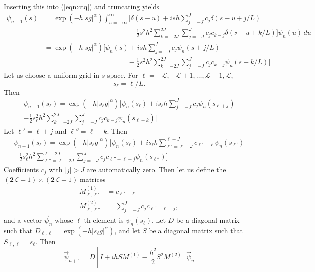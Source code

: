 \documentclass[11pt,letterpaper]{article}
\begin{document}
Inserting this into (\ref{eqn:ctq}) and truncating yields
\begin{align*}
 \psi_{n+1}(s) &=  \exp{\left(  -h |s g|^{\alpha} \right)} \int_{u=-\infty}^{\infty} \biggl[ \delta(s-u) + i s h \sum_{j=-J}^J c_j \delta(s - u + j/L) \\ 
 & \qquad \qquad \qquad \qquad \qquad \qquad - \frac{1}{2} s^2 h^2 \sum_{k=-2J}^{2J} \sum_{j=-J}^J c_j c_{k-j}  \delta(s - u + k/L) \biggr]
 \psi_{n}(u) \, du \\
 &= \exp{\left(  -h |s g|^{\alpha} \right)} \biggl[ \psi_n(s) + i s h \sum_{j=-J}^J c_j \psi_n(s+j/L) \\
 & \qquad \qquad \qquad \qquad \qquad \qquad- \frac{1}{2} s^2 h^2 \sum_{k=-2J}^{2J} \sum_{j=-J}^J c_j c_{k-j} \psi_n(s+k/L) \biggr]
\end{align*}
Let us choose a uniform grid in $s$ space.  For $\ell = -\mathcal{L}, -\mathcal{L}+1, \ldots, \mathcal{L}-1, \mathcal{L}$,
\[
s_{\ell} = \ell / L.
\]
Then
\begin{multline*}
\psi_{n+1}(s_{\ell}) = \exp{\left(  -h |s_{\ell} g|^{\alpha} \right)} \biggl[ \psi_n(s_{\ell}) + i s_{\ell} h \sum_{j=-J}^J c_j \psi_n( s_{\ell+j} ) \\
- \frac{1}{2} s_{\ell}^2 h^2 \sum_{k=-2J}^{2J} \sum_{j=-J}^J c_j c_{k-j} \psi_n( s_{\ell+k} ) \biggr]
\end{multline*}
Let $\ell' = \ell + j$ and $\ell'' = \ell + k$.  Then
\begin{multline*}
	\psi_{n+1}(s_{\ell}) = \exp{\left(  -h |s_{\ell} g|^{\alpha} \right)} \biggl[ \psi_n(s_{\ell}) + i s_{\ell} h \sum_{\ell'=\ell-J}^{\ell+J} c_{\ell' - \ell} \psi_n( s_{\ell'} ) \\
	- \frac{1}{2} s_{\ell}^2 h^2 \sum_{\ell''=\ell-2J}^{\ell+2J} \sum_{j=-J}^J c_j c_{\ell'' - \ell -j} \psi_n( s_{\ell''} ) \biggr]
\end{multline*}
Coefficients $c_j$ with $|j| > J$ are automatically zero.  Then let us define the $(2\mathcal{L}+1) \times (2 \mathcal{L}+1)$ matrices
\begin{align*}
	M^{(1)}_{\ell, \ell'} &= c_{\ell' - \ell} \\
	M^{(2)}_{\ell, \ell''} &=  \sum_{j=-J}^J c_j c_{\ell'' - \ell -j},
\end{align*}
and a vector $\vec{\psi}_n$ whose $\ell$-th element is $\psi_{n}(s_{\ell})$. Let $D$ be a diagonal matrix such that $D_{\ell,\ell} =  \exp{\left(  -h |s_{\ell} g|^{\alpha} \right)}$, and let $S$ be a diagonal matrix such that $S_{\ell,\ell} = s_{\ell}$.  Then
\[
\vec{\psi}_{n+1} = D \left[ I + i h S M^{(1)} - \frac{h^2}{2} S^2 M^{(2)}  \right] \vec{\psi}_n
\]
\end{document}
